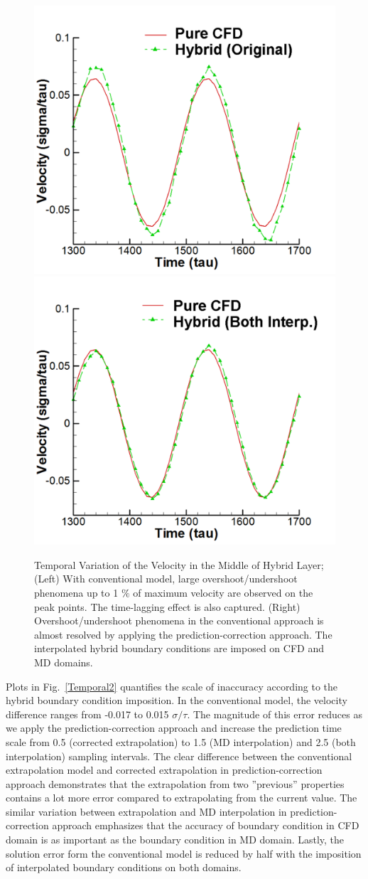 \documentclass[preprint,12pt]{elsarticle}
\begin{document}
\begin{figure}
\centering
\includegraphics[width=0.6\linewidth]{Stokes_Org_Multi.pdf}
\hskip 1cm
\includegraphics[width=0.6\linewidth]{Stokes_Both_Multi.pdf}
\vskip-0.2cm
\caption{\small Temporal Variation of the Velocity in the Middle of Hybrid Layer; (Left) With conventional model, large overshoot/undershoot phenomena up to 1 $\%$ of maximum velocity are observed on the peak points. The time-lagging effect is also captured. (Right) Overshoot/undershoot phenomena in the conventional approach is almost resolved by applying the prediction-correction approach. The interpolated hybrid boundary conditions are imposed on CFD and MD domains.}
\label{Temporal1}
\end{figure}


Plots in Fig.~\ref{Temporal2} quantifies the scale of inaccuracy according to the hybrid boundary condition imposition. In the conventional model, the velocity difference ranges from -0.017 to 0.015 $\sigma/\tau$. The magnitude of this error reduces as we apply the prediction-correction approach and increase the prediction time scale from 0.5 (corrected extrapolation) to 1.5 (MD interpolation) and 2.5 (both interpolation) sampling intervals. The clear difference between the conventional extrapolation model and corrected extrapolation in prediction-correction approach demonstrates that the extrapolation from two ''previous'' properties contains a lot more error compared to extrapolating from the current value. The similar variation between extrapolation and MD interpolation in prediction-correction approach emphasizes that the accuracy of boundary condition in CFD domain is as important as the boundary condition in MD domain. Lastly, the solution error form the conventional model is reduced by half with the imposition of interpolated boundary conditions on both domains.
\end{document}
